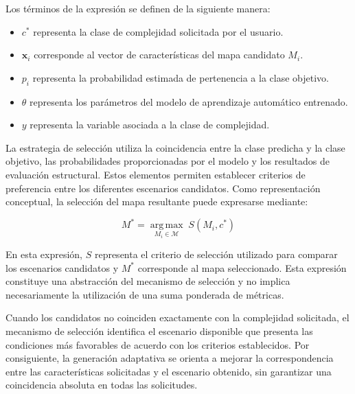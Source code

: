 Los términos de la expresión se definen de la siguiente manera:

\begin{itemize}
	
	\item $c^{*}$ representa la clase de complejidad solicitada por el usuario.
	
	\item $\mathbf{x}_i$ corresponde al vector de características del mapa candidato $M_i$.
	
	\item $p_i$ representa la probabilidad estimada de pertenencia a la clase objetivo.
	
	\item $\theta$ representa los parámetros del modelo de aprendizaje automático entrenado.
	
	\item $y$ representa la variable asociada a la clase de complejidad.
	
\end{itemize}

La estrategia de selección utiliza la coincidencia entre la clase predicha y la clase objetivo, las probabilidades proporcionadas por el modelo y los resultados de evaluación estructural. Estos elementos permiten establecer criterios de preferencia entre los diferentes escenarios candidatos. Como representación conceptual, la selección del mapa resultante puede expresarse mediante:

\begin{equation}
	M^{*} =
	\underset{M_i \in \mathcal{M}}{\operatorname{arg\,max}}
	\; S(M_i,c^{*})
	\label{eq:seleccion_mapa}
\end{equation}

En esta expresión, $S$ representa el criterio de selección utilizado para comparar los escenarios candidatos y $M^{*}$ corresponde al mapa seleccionado. Esta expresión constituye una abstracción del mecanismo de selección y no implica necesariamente la utilización de una suma ponderada de métricas.

Cuando los candidatos no coinciden exactamente con la complejidad solicitada, el mecanismo de selección identifica el escenario disponible que presenta las condiciones más favorables de acuerdo con los criterios establecidos. Por consiguiente, la generación adaptativa se orienta a mejorar la correspondencia entre las características solicitadas y el escenario obtenido, sin garantizar una coincidencia absoluta en todas las solicitudes.


